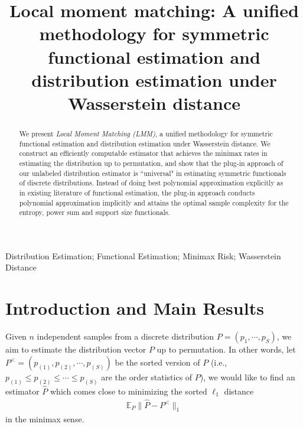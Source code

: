 \documentclass[final,12pt]{colt2018} %
\title[Local Moment Matching]{Local moment matching: A unified methodology for symmetric functional estimation and distribution estimation under Wasserstein distance}
\def \bE {\mathbb{E}}
\begin{document}
%


%
\maketitle


\begin{abstract}
We present \emph{Local Moment Matching (LMM)}, a unified methodology for symmetric functional estimation and distribution estimation under Wasserstein distance. We construct an efficiently computable estimator that achieves the minimax rates in estimating the distribution up to permutation, and show that the plug-in approach of our unlabeled distribution estimator is ``universal" in estimating symmetric functionals of discrete distributions. Instead of doing best polynomial approximation explicitly as in existing literature of functional estimation, the plug-in approach conducts polynomial approximation implicitly and attains the optimal sample complexity for the entropy, power sum and support size functionals.
\end{abstract}

\begin{keywords}
Distribution Estimation; Functional Estimation; Minimax Risk; Wasserstein Distance
\end{keywords}

\section{Introduction and Main Results}
Given $n$ independent samples from a discrete distribution $P=(p_1,\cdots,p_S)$, we aim to estimate the distribution vector $P$ up to permutation. In other words, let $P^<=(p_{(1)}, p_{(2)}, \cdots, p_{(S)})$ be the sorted version of $P$ (i.e., $p_{(1)}\le p_{(2)}\le \cdots\le p_{(S)}$ are the order statistics of $P$), we would like to find an estimator $\hat{P}$ which comes close to minimizing the sorted $\ell_1$ distance
\begin{align*}
\bE_P \lVert \hat{P}-P^<\rVert_1
\end{align*}
in the minimax sense.
\end{document}
